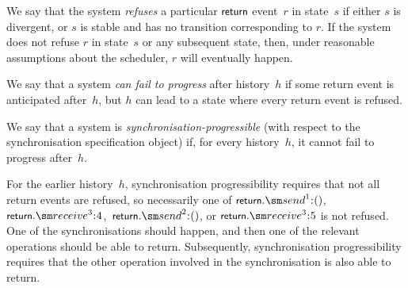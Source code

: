 We say that the system \emph{refuses} a particular $\mbox{\sf{\small return}}$ event~$r$ in
state~$s$ if either $s$ is divergent, or $s$ is stable and has no transition
corresponding to $r$.  If the system does not refuse $r$ in state~$s$ or
any subsequent state, then, under reasonable assumptions about the scheduler,
$r$ will eventually happen.

\begin{definition}
We say that a system \emph{can fail to progress} after history~$h$ if some
return event is anticipated after~$h$, but $h$ can lead to a state where
every return event is refused.

We say that a system is \emph{synchronisation-progressible} (with respect to
the synchronisation specification object) if, for every history~$h$, it cannot
fail to progress after~$h$.
\end{definition}





For the earlier history~$h$, synchronisation progressibility requires that not
all return events are refused, so necessarily one of $\return.\send^1\::()$,\,
$\return.\receive^3\::4$,\, $\return.\send^2\::()$, or
$\return.\receive^3\::5$ is not refused.
One of the synchronisations should happen, and then one of the relevant
operations should be able to return.  Subsequently, synchronisation
progressibility requires that the other operation involved in the
synchronisation is also able to return.

